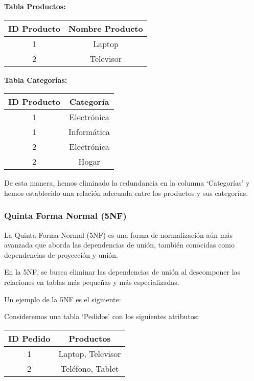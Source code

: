 \documentclass[executivepaper]{article}
\begin{document}
\textbf{Tabla Productos:}
\begin{center}
\begin{tabular}{|c|c|}
\hline
\textbf{ID Producto} & \textbf{Nombre Producto} \\
\hline
1 & Laptop \\
\hline
2 & Televisor \\
\hline
\end{tabular}
\end{center}

\textbf{Tabla Categorías:}
\begin{center}
\begin{tabular}{|c|c|}
\hline
\textbf{ID Producto} & \textbf{Categoría} \\
\hline
1 & Electrónica \\
\hline
1 & Informática \\
\hline
2 & Electrónica \\
\hline
2 & Hogar \\
\hline
\end{tabular}
\end{center}

De esta manera, hemos eliminado la redundancia en la columna \enquote*{Categorías} y hemos establecido una relación adecuada entre los productos y sus categorías.

\subsubsection*{Quinta Forma Normal (5NF)}

La Quinta Forma Normal (5NF) es una forma de normalización aún más avanzada que aborda las dependencias de unión, también conocidas como dependencias de proyección y unión.

En la 5NF, se busca eliminar las dependencias de unión al descomponer las relaciones en tablas más pequeñas y más especializadas.

Un ejemplo de la 5NF es el siguiente:

Consideremos una tabla \enquote*{Pedidos} con los siguientes atributos:

\begin{center}
\begin{tabular}{|c|c|}
\hline
\textbf{ID Pedido} & \textbf{Productos} \\
\hline
1 & Laptop, Televisor \\
\hline
2 & Teléfono, Tablet \\
\hline
\end{tabular}
\end{center}
\end{document}
